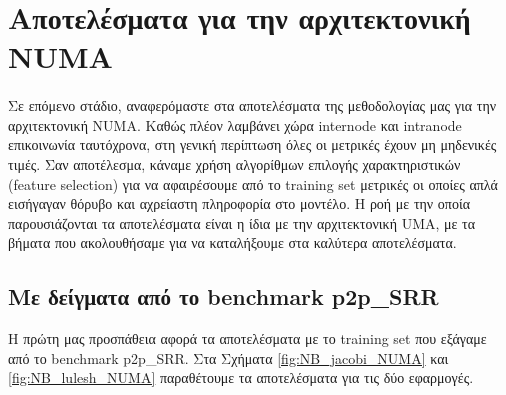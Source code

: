 \section{Αποτελέσματα για την αρχιτεκτονική NUMA}

\paragraph{}
Σε επόμενο στάδιο, αναφερόμαστε στα αποτελέσματα της μεθοδολογίας μας για την αρχιτεκτονική NUMA. Καθώς πλέον λαμβάνει χώρα internode και intranode επικοινωνία ταυτόχρονα, στη γενική περίπτωση όλες οι μετρικές έχουν μη μηδενικές τιμές. Σαν αποτέλεσμα, κάναμε χρήση αλγορίθμων επιλογής χαρακτηριστικών (feature selection) για να αφαιρέσουμε από το training set μετρικές οι οποίες απλά εισήγαγαν θόρυβο και αχρείαστη πληροφορία στο μοντέλο. Η ροή με την οποία παρουσιάζονται τα αποτελέσματα είναι η ίδια με την αρχιτεκτονική UMA, με τα βήματα που ακολουθήσαμε για να καταλήξουμε στα καλύτερα αποτελέσματα. 

\subsection{Με δείγματα από το benchmark p2p\_SRR}
Η πρώτη μας προσπάθεια αφορά τα αποτελέσματα με το training set που εξάγαμε από το benchmark p2p\_SRR. Στα Σχήματα \ref{fig:NB_jacobi_NUMA} και \ref{fig:NB_lulesh_NUMA} παραθέτουμε τα αποτελέσματα για τις δύο εφαρμογές.

